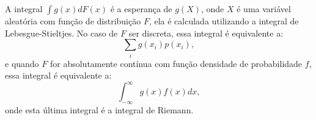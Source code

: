 \begin{frame}
\begin{nota}[lembrete] A integral $\int g(x)dF(x)$ é a esperança de $g(X)$, onde $X$ é
uma variável aleatória com função de distribuição $F$, ela é
calculada utilizando a integral de Lebesgue-Stieltjes. No caso de
$F$ ser discreta, essa integral é equivalente a:
$$\sum_ig(x_i)p(x_i),$$
e quando $F$ for absolutamente contínua com função densidade de
probabilidade $f$, essa integral é equivalente a:
$$\int_{-\infty}^{\infty}g(x)f(x)dx,$$
onde esta última integral é a integral de Riemann.
\end{nota}

\end{frame}

%
%
%
%
%
%
%
%
%
%
%
